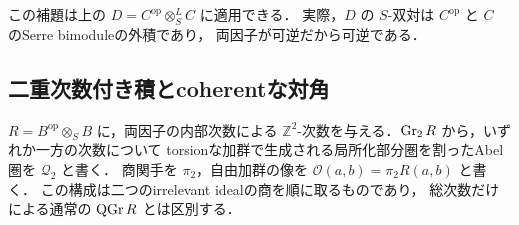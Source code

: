 この補題は上の $D=C^{\mathrm{op}}\otimes_S^LC$ に適用できる．
実際，$D$ の $S$-双対は $C^{\mathrm{op}}$ と $C$ のSerre bimoduleの外積であり，
両因子が可逆だから可逆である．

\subsection{二重次数付き積とcoherentな対角}

$R=B^{\mathrm{op}}\otimes_S B$ に，両因子の内部次数による
$\mathbb Z^2$-次数を与える．$\operatorname{Gr}_2 R$ から，いずれか一方の次数について
torsionな加群で生成される局所化部分圏を割ったAbel圏を $\mathcal Q_2$ と書く．
商関手を $\pi_2$，自由加群の像を
$\mathcal O(a,b)=\pi_2 R(a,b)$ と書く．
この構成は二つのirrelevant idealの商を順に取るものであり，
総次数だけによる通常の $\operatorname{QGr} R$ とは区別する．

